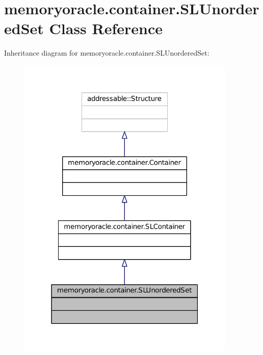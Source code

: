 \hypertarget{classmemoryoracle_1_1container_1_1SLUnorderedSet}{}\section{memoryoracle.\+container.\+S\+L\+Unordered\+Set Class Reference}
\label{classmemoryoracle_1_1container_1_1SLUnorderedSet}


Inheritance diagram for memoryoracle.\+container.\+S\+L\+Unordered\+Set\+:\nopagebreak
\begin{figure}[H]
\begin{center}
\leavevmode
\includegraphics[width=295pt]{classmemoryoracle_1_1container_1_1SLUnorderedSet__inherit__graph}
\end{center}
\end{figure}


